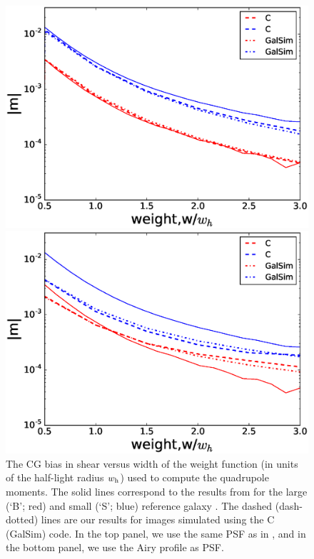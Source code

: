 \documentclass[useAMS,usenatbib]{mnras}
\begin{document}
%
\begin{figure}
  \centerline{\includegraphics[width=\hsize]{cvsgalsim.eps}}
  \centerline{\includegraphics[width=\hsize]{zweight_airy.eps}}
\caption{The CG bias in shear versus width of the weight function (in
  units of the half-light radius $w_{\rm h}$) used to compute the
  quadrupole moments.  The solid lines correspond to the results from
   for the large (`B'; red) and small (`S';
  blue) reference galaxy .  The dashed (dash-dotted) lines are our
  results for images simulated using the C (GalSim) code. In the top
  panel, we use the same PSF as in , and in
  the bottom panel, we use the Airy profile as PSF. }
\label{fig:biasofweight}
\end{figure}
%
\end{document}
